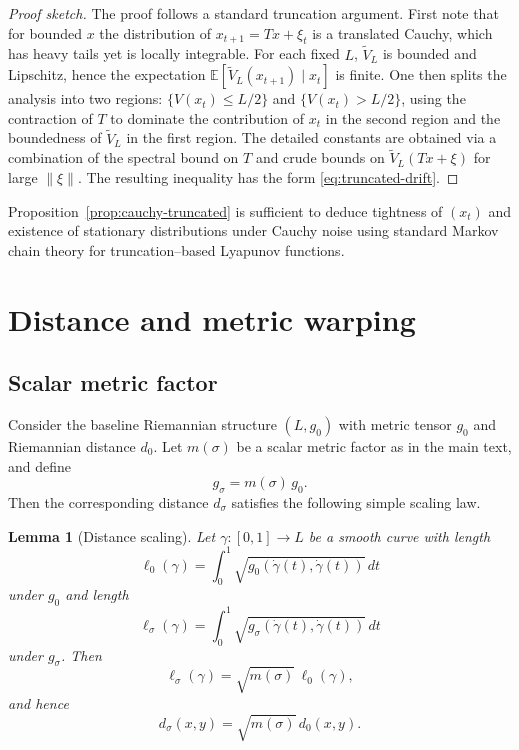 \documentclass[11pt]{article}
\theoremstyle{plain}
\newtheorem{lemma}[theorem]{Lemma}
\theoremstyle{definition}
\numberwithin{equation}{section}
\begin{document}
\begin{proof}[Proof sketch]
The proof follows a standard truncation argument. First note that for
bounded $x$ the distribution of $x_{t+1} = T x + \xi_t$ is a translated
Cauchy, which has heavy tails yet is locally integrable. For each
fixed $L$, $\tilde{V}_L$ is bounded and Lipschitz, hence the expectation
$\mathbb{E}[\tilde{V}_L(x_{t+1}) \mid x_t]$ is finite. One then splits
the analysis into two regions: $\{V(x_t) \le L/2\}$ and
$\{V(x_t) > L/2\}$, using the contraction of $T$ to dominate the
contribution of $x_t$ in the second region and the boundedness of
$\tilde{V}_L$ in the first region. The detailed constants are obtained
via a combination of the spectral bound on $T$ and crude bounds on
$\tilde{V}_L(Tx + \xi)$ for large $\|\xi\|$. The resulting inequality
has the form \eqref{eq:truncated-drift}.
\end{proof}

Proposition~\ref{prop:cauchy-truncated} is sufficient to deduce tightness
of $(x_t)$ and existence of stationary distributions under Cauchy noise
using standard Markov chain theory for truncation--based Lyapunov
functions.

\section{Distance and metric warping}

\subsection{Scalar metric factor}

Consider the baseline Riemannian structure $(L,g_0)$ with metric tensor
$g_0$ and Riemannian distance $d_0$. Let $m(\sigma)$ be a scalar metric
factor as in the main text, and define
\begin{equation}
  g_\sigma = m(\sigma)\, g_0.
\end{equation}
Then the corresponding distance $d_\sigma$ satisfies the following
simple scaling law.

\begin{lemma}[Distance scaling]
\label{lem:distance-scaling}
Let $\gamma : [0,1] \to L$ be a smooth curve with length
\[
\ell_0(\gamma) = \int_0^1 \sqrt{g_0(\dot{\gamma}(t),\dot{\gamma}(t))}\,dt
\]
under $g_0$ and length
\[
\ell_\sigma(\gamma) = \int_0^1 \sqrt{g_\sigma(\dot{\gamma}(t),\dot{\gamma}(t))}\,dt
\]
under $g_\sigma$. Then
\begin{equation}
  \ell_\sigma(\gamma) = \sqrt{m(\sigma)}\, \ell_0(\gamma),
\end{equation}
and hence
\begin{equation}
  d_\sigma(x,y) = \sqrt{m(\sigma)}\, d_0(x,y).
\end{equation}
\end{lemma}
\end{document}
